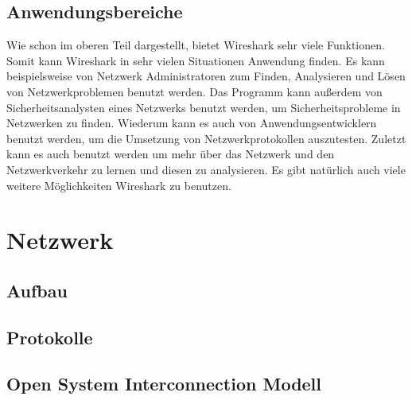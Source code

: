 \documentclass[12pt]{article}
\begin{document}
\subsection{Anwendungsbereiche}
Wie schon im oberen Teil dargestellt, bietet Wireshark sehr viele Funktionen. Somit kann Wireshark in sehr vielen Situationen Anwendung finden. Es kann beispielsweise von Netzwerk Administratoren zum Finden, Analysieren und Lösen von Netzwerkproblemen benutzt werden. Das Programm kann außerdem von Sicherheitsanalysten eines Netzwerks benutzt werden, um Sicherheitsprobleme in Netzwerken zu finden. Wiederum kann es auch von Anwendungsentwicklern benutzt werden, um die Umsetzung von Netzwerkprotokollen auszutesten. Zuletzt kann es auch benutzt werden um mehr über das Netzwerk und den Netzwerkverkehr zu lernen und diesen zu analysieren. Es gibt natürlich auch viele weitere Möglichkeiten Wireshark zu benutzen. \cite{intended-purposes}

\newpage

\section{Netzwerk}

\subsection{Aufbau}
\subsection{Protokolle}

\subsection{Open System Interconnection Modell}
\end{document}
